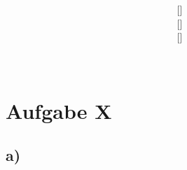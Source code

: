\documentclass[12pt]{scrartcl}
\title{
	\Huge{\workSheetNr} \\
	\Large{\courseFull}
}
\author{
	\textbf{\memberA} [\memberAMartikel ]~\textit{\memberAMail } \\
	\textbf{\memberB} [\memberBMartikel ]~\textit{\memberBMail } \\
	\textbf{\memberC} [\memberCMartikel ]~\textit{\memberCMail } \\ \\
}
\date{\dateOfFinishing}
\begin{document}
	\maketitle
	\newpage

	\section*{Aufgabe X}
	\subsection*{a)}
\end{document}
